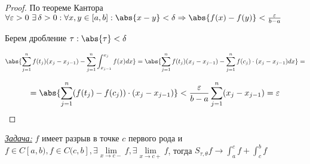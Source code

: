 \begin{proof}

    По теореме Кантора $\forall \varepsilon > 0 \,\, \exists \, \delta > 0 : \forall x, y \in [a, b] : \abs{x - y} < \delta \Rightarrow \abs{f(x) - f(y)} < \frac{\varepsilon}{b - a}$

    Берем дробление $\tau : \abs{\tau}  < \delta $

    \[
        \abs{\sum_{j = 1}^n f(t_j) (x_j - x_{j - 1}) - \sum_{j = 1}^n \int_{x_{j - 1}}^{x_j} f(x) dx} = \abs{\sum_{j = 1}^n f(t_j) (x_j - x_{j - 1}) - \sum_{j = 1}^n f(c_j) \cdot (x_j - x_{j - 1}) dx} = 
    \]

    \[
        = \abs{
            \sum_{j = 1} ^ n (f(t_j) - f(c_j)) \cdot (x_j - x_{j - 1})
        } < \frac{\varepsilon}{b - a} \sum_{j = 1} ^ n (x_j - x_{j - 1}) = \varepsilon
    \]
\end{proof}


\underline{\textit{Задача:}}  $f$ имеет разрыв в точке $c$ первого рода и $f \in C[a, b), f \in C(c,b], \exists \lim\limits_{x \to c-}{f}, \exists \lim\limits_{x \to c+}{f}$, тогда $S_{\tau, \theta} f \to \int_a^c f + \int_c^b f$

\quad 

